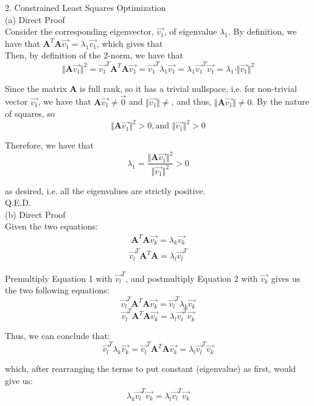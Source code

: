 \documentclass{article}
\begin{document}
{\Large 2. Constrained Least Squares Optimization} \\[.5cm]
{\color{red} (a) Direct Proof } \\

Consider the corresponding eigenvector, $\vec{v_1}$, of eigenvalue $\lambda_1$. By definition, we have that
$\mathbf{A}^T\mathbf{A}\vec{v_1} = \lambda_1\vec{v_1}$, which gives that \\

Then, by definition of the 2-norm, we have that
$$\Vert\mathbf{A}\vec{v_1}\Vert^2 =
\vec{v_1}^T \mathbf{A}^T\mathbf{A} \vec{v_1} =
\vec{v_1}^T \lambda_1 \vec{v_1} =
\lambda_1 \vec{v_1}^T\vec{v_1} =
\lambda_1 \cdot \Vert\vec{v_1}\Vert^2$$

Since the matrix $\mathbf{A}$ is full rank, so it has a trivial nullspace, i.e. for non-trivial vector $\vec{v_1}$, we have that $\mathbf{A}\vec{v_1}\neq\vec{0}$ and $\Vert\vec{v_1}\Vert\neq$, and thus, $\Vert\mathbf{A}\vec{v_1}\Vert\neq0$. By the nature of squares, so
$$\Vert\mathbf{A}\vec{v_1}\Vert^2 > 0,\text{and }
\Vert\vec{v_1}\Vert^2 > 0$$

Therefore, we have that
$$\lambda_1 = \frac{\Vert\mathbf{A}\vec{v_1}\Vert^2}{\Vert\vec{v_1}\Vert^2} > 0$$

as desired, i.e. all the eigenvalues are strictly positive. \\

Q.E.D. \\[.5cm]
{\color{red} (b) Direct Proof } \\

Given the two equations:
\begin{align}
	\mathbf{A}^T \mathbf{A} \vec{v_k} = \lambda_k \vec{v_k}
\end{align}
\begin{align}
	\vec{v_l}^T \mathbf{A}^T \mathbf{A} = \lambda_l \vec{v_l}^T
\end{align}

Premultiply Equation 1 with $\vec{v_l}^T$, and postmultiply Equation 2 with $\vec{v_k}$ gives us the two following equations:
$$ \vec{v_l}^T \mathbf{A}^T \mathbf{A} \vec{v_k} =
\vec{v_l}^T \lambda_k \vec{v_k} $$
$$ \vec{v_l}^T \mathbf{A}^T \mathbf{A} \vec{v_k} =
\lambda_l \vec{v_l}^T \vec{v_k} $$

Thus, we can conclude that:
$$\vec{v_l}^T \lambda_k \vec{v_k} =
\vec{v_l}^T \mathbf{A}^T \mathbf{A} \vec{v_k} =
\lambda_l \vec{v_l}^T \vec{v_k} $$

which, after rearranging the terms to put constant (eigenvalue) as first, would give us:
\begin{align}
	\lambda_k \vec{v_l}^T \vec{v_k} =
	\lambda_l \vec{v_l}^T \vec{v_k}
\end{align}
\end{document}
